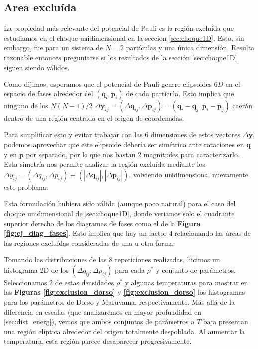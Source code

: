 \subsection{Area excluída}

La propiedad más relevante del potencial de Pauli es la región excluída que estudiamos en el choque unidimensional en la seccion \ref{sec:choque1D}.
Esto, sin embargo, fue para un sistema de $N=2$ partículas y una única dimensión.
Resulta razonable entonces preguntarse si los resultados de la sección \ref{sec:choque1D} siguen siendo válidos.

Como dijimos, esperamos que el potencial de Pauli genere elipsoides $6D$ en el espacio de fases alrededor del $(\mathbf{q}_i,\mathbf{p}_i)$ de cada partícula.
Esto implica que ninguno de los $N(N-1)/2$ $\Delta \mathbf{y}_{ij} = (\Delta \mathbf{q}_{ij}, \Delta \mathbf{p}_{ij}) = (\mathbf{q}_i-\mathbf{q}_j,\mathbf{p}_i-\mathbf{p}_j)$ caerán dentro 
de una región centrada en el origen de coordenadas.

Para simplificar esto y evitar trabajar con las 6 dimensiones de estos vectores $\Delta \mathbf{y}$, podemos aprovechar que este elipsoide debería ser simétrico ante rotaciones en $\mathbf{q}$ 
y en $\mathbf{p}$ por separado, por lo que nos bastan 2 magnitudes para caracterizarlo.
Esta simetría nos permite analizar la región excluída mediante los $\Delta y_{ij} = (\Delta q_{ij},\Delta p_{ij}) \equiv (|\Delta \mathbf{q}_{ij}|, |\Delta \mathbf{p}_{ij}|)$, volviendo 
unidimensional nuevamente este problema.

Esta formulación hubiera sido válida (aunque poco natural) para el caso del choque unidimensional de \ref{sec:choque1D}, donde veriamos solo el cuadrante superior derecho de los diagramas de 
fases como el de la \textbf{Figura \ref{fig:ej_diag_fases}}.
Esto implica que hay un factor $4$ relacionando las áreas de las regiones excluídas consideradas de una u otra forma.

Tomando las distribuciones de las 8 repeticiones realizadas, hicimos un histograma 2D de los $(\Delta q_{ij},\Delta p_{ij})$ para cada $\rho^*$ y conjunto de parámetros.
Seleccionamos 2 de estas densidades $\rho^*$ y algunas temperaturas para mostrar en las \textbf{Figuras \ref{fig:exclusion_dorso}} y \textbf{\ref{fig:exclusion_dorso}} los histogramas 
para los parámetros de Dorso y Maruyama, respectivamente.
Más allá de la diferencia en escalas (que analizaremos en mayor profundidad en \ref{sec:dist_energ}), vemos que ambos conjuntos de parámetros a $T$ baja presentan una región elíptica alrededor
del origen totalmente despoblada. 
Al aumentar la temperatura, esta región parece desaparecer progresivamente.

